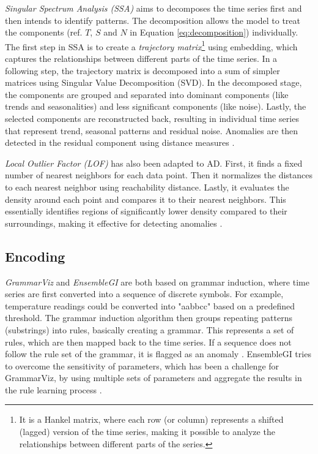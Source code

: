 \textit{Singular Spectrum Analysis (SSA)} aims to decomposes the time series first and then intends to identify patterns. The decomposition allows the model to treat the components (ref. $T$, $S$ and $N$ in Equation \ref{eq:decomposition}) individually. The first step in SSA is to create a \textit{trajectory matrix}\footnote{It is a Hankel matrix, where each row (or column) represents a shifted (lagged) version of the time series, making it possible to analyze the relationships between different parts of the series.} using embedding, which captures the relationships between different parts of the time series. In a following step, the trajectory matrix is decomposed into a sum of simpler matrices using Singular Value Decomposition (SVD). In the decomposed stage, the components are grouped and separated into dominant components (like trends and seasonalities) and less significant components (like noise). Lastly, the selected components are reconstructed back, resulting in individual time series that represent trend, seasonal patterns and residual noise. Anomalies are then detected in the residual component using distance measures \cite{SSA}.

\textit{Local Outlier Factor (LOF)} has also been adapted to AD. First, it finds a fixed number of nearest neighbors for each data point. Then it normalizes the distances to each nearest neighbor using reachability distance. Lastly, it evaluates the density around each point and compares it to their nearest neighbors. This essentially identifies regions of significantly lower density compared to their surroundings, making it effective for detecting anomalies \cite{Sub-LOF}.


\subsection{Encoding}
\textit{GrammarViz} and \textit{EnsembleGI} are both based on grammar induction, where time series are first converted into a sequence of discrete symbols. For example, temperature readings could be converted into "aabbcc" based on a predefined threshold. The grammar induction algorithm then groups repeating patterns (substrings) into rules, basically creating a grammar. This represents a set of rules, which are then mapped back to the time series. If a sequence does not follow the rule set of the grammar, it is flagged as an anomaly \cite{GrammarViz}.
EnsembleGI tries to overcome the sensitivity of parameters, which has been a challenge for GrammarViz, by using multiple sets of parameters and aggregate the results in the rule learning process \cite{EnsembleGI}.

